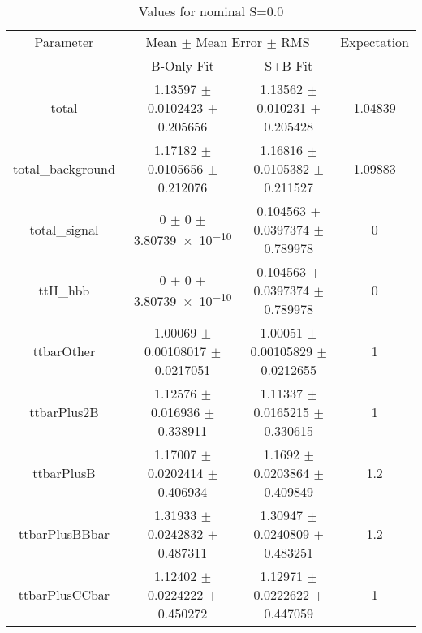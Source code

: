 \begin{table}
\centering
\caption{Values for nominal S=0.0}
\begin{tabular}{cccc}
\toprule
Parameter & \multicolumn{2}{c}{Mean $\pm$ Mean Error $\pm$ RMS} & Expectation\\
 & B-Only Fit & S+B Fit & \\
\midrule
total & \num{1.13597} $\pm$ \num{0.0102423} $\pm$ \num{0.205656} & \num{1.13562} $\pm$ \num{0.010231} $\pm$ \num{0.205428} & \num{1.04839}\\
total\_background & \num{1.17182} $\pm$ \num{0.0105656} $\pm$ \num{0.212076} & \num{1.16816} $\pm$ \num{0.0105382} $\pm$ \num{0.211527} & \num{1.09883}\\
total\_signal & \num{0} $\pm$ \num{0} $\pm$ \num{3.80739e-10} & \num{0.104563} $\pm$ \num{0.0397374} $\pm$ \num{0.789978} & \num{0}\\
ttH\_hbb & \num{0} $\pm$ \num{0} $\pm$ \num{3.80739e-10} & \num{0.104563} $\pm$ \num{0.0397374} $\pm$ \num{0.789978} & \num{0}\\
ttbarOther & \num{1.00069} $\pm$ \num{0.00108017} $\pm$ \num{0.0217051} & \num{1.00051} $\pm$ \num{0.00105829} $\pm$ \num{0.0212655} & \num{1}\\
ttbarPlus2B & \num{1.12576} $\pm$ \num{0.016936} $\pm$ \num{0.338911} & \num{1.11337} $\pm$ \num{0.0165215} $\pm$ \num{0.330615} & \num{1}\\
ttbarPlusB & \num{1.17007} $\pm$ \num{0.0202414} $\pm$ \num{0.406934} & \num{1.1692} $\pm$ \num{0.0203864} $\pm$ \num{0.409849} & \num{1.2}\\
ttbarPlusBBbar & \num{1.31933} $\pm$ \num{0.0242832} $\pm$ \num{0.487311} & \num{1.30947} $\pm$ \num{0.0240809} $\pm$ \num{0.483251} & \num{1.2}\\
ttbarPlusCCbar & \num{1.12402} $\pm$ \num{0.0224222} $\pm$ \num{0.450272} & \num{1.12971} $\pm$ \num{0.0222622} $\pm$ \num{0.447059} & \num{1}\\
\bottomrule
\end{tabular}
\end{table}